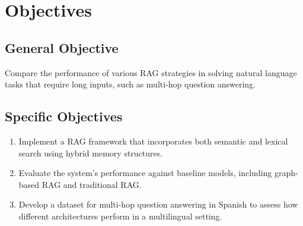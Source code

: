 \section{Objectives}
\label{sec:objectives}

\subsection{General Objective}
Compare the performance of various RAG strategies in solving natural language tasks that require long inputs, such as multi-hop question answering.

\subsection{Specific Objectives}

\begin{enumerate}
    \item Implement a RAG framework that incorporates both semantic and lexical search using hybrid memory structures.
    \item Evaluate the system's performance against baseline models, including graph-based RAG and traditional RAG.
    \item Develop a dataset for multi-hop question answering in Spanish to assess how different architectures perform in a multilingual setting.
\end{enumerate}